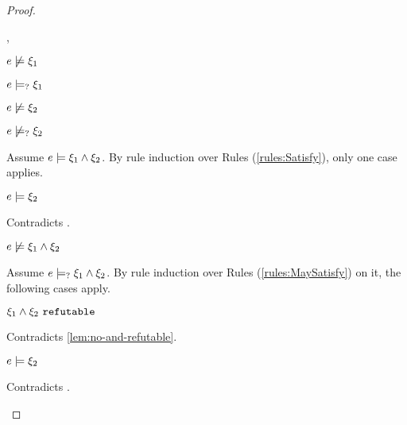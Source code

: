 \begin{proof}
\begin{byCases}
\begin{byCases}
    \item[\cmaysatisfy{e}{\xi_1},\cnotsatisfyormay{e}{\xi_2}]
        \begin{pfsteps*}
        \item $e \not\models \xi_1$  
        \item $e \models_{?} \xi_1$  
        \item $e \not\models \xi_2$  
        \item $e \not\models_{?} \xi_2$  
        \end{pfsteps*}
        Assume $e \models \xi_1 \wedge \xi_2$. By rule induction over Rules (\ref{rules:Satisfy}), only one case applies.
        \begin{byCases}
        \item[\text{(\ref{rule:CSAnd})}]
            \begin{pfsteps*}
            \item $e \models \xi_2$ 
            \end{pfsteps*}
            Contradicts .
        \end{byCases}
        \begin{pfsteps*}
        \item $e \not\models \xi_1 \wedge \xi_2$  
        \end{pfsteps*}
        Assume $e \models_{?} \xi_1 \wedge \xi_2$. By rule induction over Rules (\ref{rules:MaySatisfy}) on it, the following cases apply.
        \begin{byCases}
        \item[\text{(\ref{rule:CMSNotVal})}]
            \begin{pfsteps*}
            \item $\xi_1 \wedge \xi_2 ~\mathtt{refutable}$ 
            \end{pfsteps*}
            Contradicts \autoref{lem:no-and-refutable}.
        \item[\text{(\ref{rule:CMSAnd1})}]
            \begin{pfsteps*}
            \item $e \models \xi_2$ 
            \end{pfsteps*}
            Contradicts .

\end{byCases}
\end{byCases}
\end{byCases}
\end{proof}
